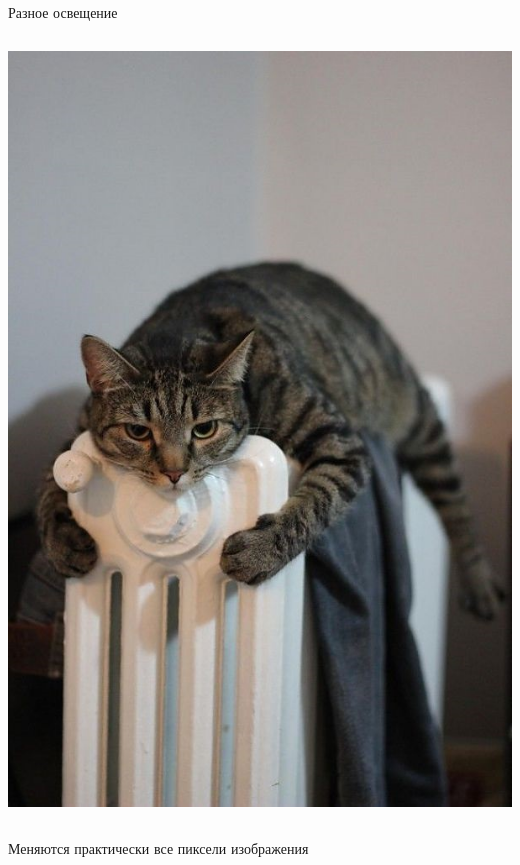 \documentclass[aspectratio=169, professionalfonts]{beamer}
\begin{document}
\begin{frame}{Разное освещение}
\begin{columns}
\begin{column}{.25\linewidth}
            \includegraphics[width=\linewidth]{figures/fig21-cat.jpg}
        \end{column}
    \end{columns}
    \begin{center}
        Меняются практически все пиксели изображения
    \end{center}
\end{frame}
\end{document}

